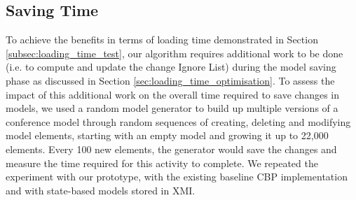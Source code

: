 \documentclass{llncs}
\begin{document}
\subsection{Saving Time}
\label{subsec:saving_time_test}

To achieve the benefits in terms of loading time demonstrated in Section \ref{subsec:loading_time_test}, our algorithm requires additional work to be done (i.e. to compute and update the change Ignore List) during the model saving phase as discussed in Section \ref{sec:loading_time_optimisation}. To assess the impact of this additional work on the overall time required to save changes in models, we used a random model generator to build up multiple versions of a conference model through random sequences of creating, deleting and modifying model elements, starting with an empty model and growing it up to 22,000 elements. Every 100 new elements, the generator would save the changes and measure the time required for this activity to complete. We repeated the experiment with our prototype, with the existing baseline CBP implementation and with state-based models stored in XMI.
\end{document}
